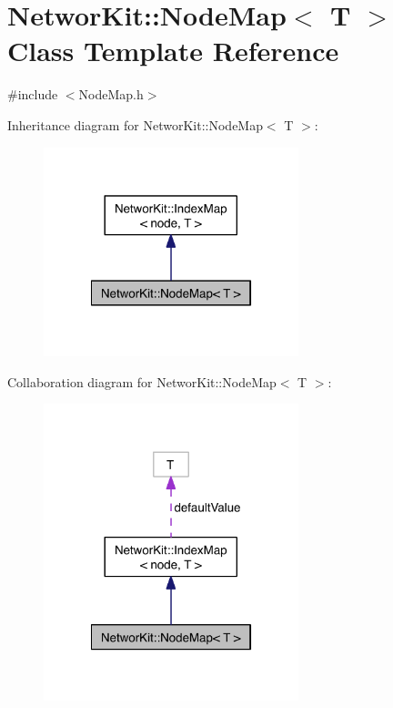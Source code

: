 \hypertarget{class_networ_kit_1_1_node_map}{\section{Networ\-Kit\-:\-:Node\-Map$<$ T $>$ Class Template Reference}
\label{class_networ_kit_1_1_node_map}
}


{\ttfamily \#include $<$Node\-Map.\-h$>$}



Inheritance diagram for Networ\-Kit\-:\-:Node\-Map$<$ T $>$\-:\nopagebreak
\begin{figure}[H]
\begin{center}
\leavevmode
\includegraphics[width=210pt]{class_networ_kit_1_1_node_map__inherit__graph}
\end{center}
\end{figure}


Collaboration diagram for Networ\-Kit\-:\-:Node\-Map$<$ T $>$\-:\nopagebreak
\begin{figure}[H]
\begin{center}
\leavevmode
\includegraphics[width=210pt]{class_networ_kit_1_1_node_map__coll__graph}
\end{center}
\end{figure}
